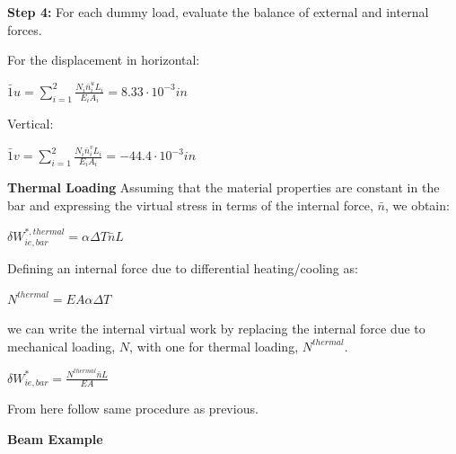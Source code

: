 \documentclass{article}
\begin{document}
\begin{multicols*}{2}
   \textbf{Step 4:} For each dummy load, evaluate the balance of external and 
   internal forces. \par 
   For the displacement in horizontal:\par 
   $\bar{1}u = \sum\limits_{i=1}^2 \frac{N_i\bar{n}_i^uL_i}{E_iA_i} = 8.33 \cdot 10^{-3} in$ \par 
   Vertical: \par 
   $\bar{1}v = \sum\limits_{i=1}^2 \frac{N_i\bar{n}_i^vL_i}{E_iA_i} = -44.4 \cdot 10^{-3} in$ \par

    \textbf{Thermal Loading}
    Assuming that the material properties are constant in the bar and expressing
    the virtual stress in terms of the internal force, $\bar{n}$, we obtain:\par
    $\delta W_{ie,bar}^{*,thermal}=\alpha \Delta T \bar{n} L$\par 
    Defining an internal force due to differential heating/cooling as:\par
    $N^{thermal} = EA\alpha \Delta T$\par 
    we can write the internal virtual work by replacing the internal force due to
    mechanical loading, $N$, with one for thermal loading, $N^{thermal}$.\par 
    $\delta W_{ie,bar}^* = \frac{N^{thermal}\bar{n}L}{EA}$\par 
    From here follow same procedure as previous.

    \textbf{Beam Example}
  


\end{multicols*}  
\end{document}
